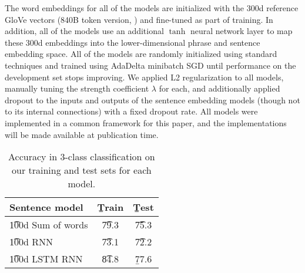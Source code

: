 The word embeddings for all of the models are initialized with the 300d reference GloVe vectors (840B token version, \citealt{pennington2014glove}) and fine-tuned as part of training. In addition, all of the models use an additional $\tanh$ neural network layer to map these 300d embeddings into the lower-dimensional phrase and sentence embedding space. All of the models are randomly initialized using standard techniques and trained using AdaDelta \cite{zeiler2012adadelta} minibatch SGD until performance on the development set stops improving. We applied L2 regularization to all models, manually tuning the strength coefficient $\lambda$ for each, and additionally applied dropout \cite{srivastava2014dropout} to the inputs and outputs of the sentence embedding models (though not to its internal connections) with a fixed dropout rate. All models were implemented in a common framework for this paper, and the implementations will be made available at publication time.

\begin{table}
\begin{center}
\begin{tabular}{l@{\hskip \colspaceL}@{\hskip \colspaceL}c@{\hskip \colspaceL}c}
\toprule
\textbf{Sentence model} & \b{Train}  & \b{Test}\\
\midrule
\t{100d Sum of words}            & \t{79.3} & \t{75.3} \\

\t{100d RNN}            & \t{73.1} & \t{72.2} \\	

\t{100d LSTM RNN}            & \t{84.8} & \b{77.6} \\

\bottomrule
\end{tabular}
\end{center}
\caption{
\label{tab:nnresults}
Accuracy in 3-class classification on our training and test sets for each model.
}
\end{table}

